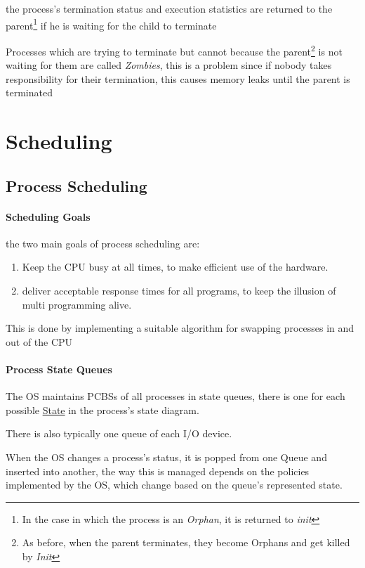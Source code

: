 \documentclass[openright, twoside]{report}
\theoremstyle{definition}
\theoremstyle{example}
\begin{document}
				the process's termination status and execution statistics are returned to the parent\footnote{
					In the case in which the process is an \emph{Orphan}, it is returned to \emph{init}
				}
				if he is waiting for the child to terminate

				Processes which are trying to terminate but cannot because the parent\footnote{
					As before, when the parent terminates, they become Orphans and get killed by
					\emph{Init}
				} is not waiting for them 
				are called \emph{Zombies}, this is a problem since if nobody takes responsibility for their 
				termination, this causes memory leaks until the parent is terminated

	\section{Scheduling}
	\label{sec:scheduling}
		\subsection{Process Scheduling}
			\paragraph{Scheduling Goals}
				the two main goals of process scheduling are:
				\begin{enumerate}
					\item Keep the CPU busy at all times, to make efficient use of the hardware.
					\item deliver acceptable response times for all programs, to keep the illusion 
					of multi programming alive.
				\end{enumerate}

				This is done by implementing a suitable algorithm for swapping processes 
				in and out of the CPU 

			\paragraph{Process State Queues}
				The OS maintains PCBSs of all processes in state queues, there is one 
				for each possible \hyperref[sec:procStates]{State} in the process's state diagram.

				There is also typically one queue of each I/O device.

				When the OS changes a process's status, it is popped from one Queue 
				and inserted into another, the way this is managed depends on the  
				policies implemented by the OS, which change based on the queue's 
				represented state.
\end{document}

